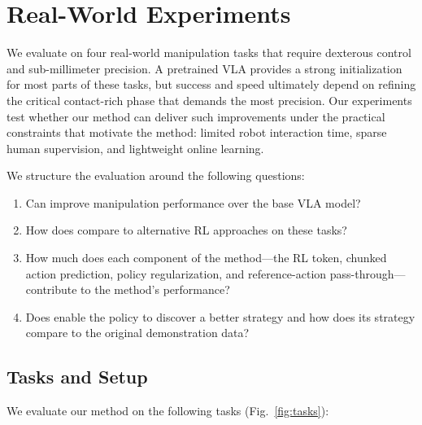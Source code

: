 \section{Real-World Experiments}
\label{sec:experiments}

We evaluate \MethodName{} on four real-world manipulation tasks that require dexterous control and sub-millimeter precision. A pretrained VLA provides a strong initialization for most parts of these tasks, but success and speed ultimately depend on refining the critical contact-rich phase that demands the most precision. Our experiments test whether our method can deliver such improvements under the practical constraints that motivate the method: limited robot interaction time, sparse human supervision, and lightweight online learning.


We structure the evaluation around the following questions:
\begin{enumerate}
    \item[\textbf{Q1.}] Can \MethodName{} improve manipulation performance over the base VLA model?
    \item[\textbf{Q2.}] How does \MethodName{} compare to alternative RL approaches on these tasks?
    \item[\textbf{Q3.}] How much does each component of the method---the RL token, chunked action prediction, policy regularization, and reference-action pass-through---contribute to the method's performance?
    \item[\textbf{Q4.}] Does \MethodName{} enable the policy to discover a better strategy and how does its strategy compare to the original demonstration data? 
\end{enumerate}
\subsection{Tasks and Setup}
\label{sec:tasks}


We evaluate our method on the following tasks (Fig.~\ref{fig:tasks}):

